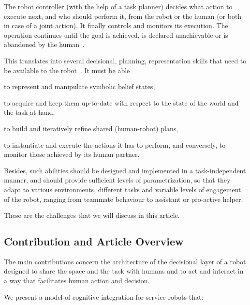 \documentclass[preprint,3p,times]{elsarticle}
\begin{document}
The robot controller (with the help of a task planner) decides what action to
execute next, and who should perform it, from the robot or the human (or both in
case of a joint action). It finally controls and monitors its execution. The
operation continues until the goal is achieved, is declared unachievable or is
abandoned by the human~\cite{Klein2004}.

\begin{inparaenum}

This translates into several decisional, planning, representation skills that
need to be available to the robot~\cite{alami2011robot}. It must be able \item
to represent and manipulate symbolic belief states, \item to acquire and keep
them up-to-date with respect to the state of the world and the task at hand,
\item to build and iteratively refine shared (human-robot) plans, \item to
instantiate and execute the actions it has to perform, and conversely, to
monitor those achieved by its human partner.

\end{inparaenum}

Besides, such abilities should be designed and implemented in a task-independent
manner, and should provide sufficient levels of parametrization, so that they adapt to
various environments, different tasks and variable levels of engagement of the
robot, ranging from teammate behaviour to assistant or pro-active helper.

These are the challenges that we will discuss in this article.

\subsection{Contribution and Article Overview}

The main contributions concern the architecture of the decisional layer of a robot designed to share 
the space and the task with humans and to act and interact in a way that facilitates human action and decision.

We present a model of cognitive integration for service robots that:
\end{document}
